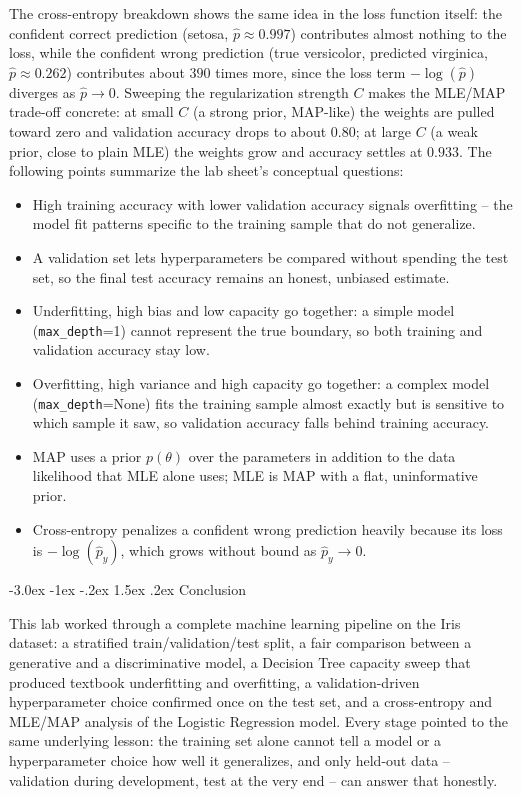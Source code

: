\documentclass[12pt,a4paper]{article}
\makeatletter
\renewcommand{\section}{\@startsection{section}{1}{\z@}%
  {-3.0ex \@plus -1ex \@minus -.2ex}%
  {1.5ex \@plus.2ex}%
  {\normalfont\Large\bfseries\color{primaryblue}}}
\makeatother
\begin{document}
The cross-entropy breakdown shows the same idea in the loss function itself: the confident correct prediction (setosa, $\hat p \approx 0.997$) contributes almost nothing to the loss, while the confident wrong prediction (true versicolor, predicted virginica, $\hat p \approx 0.262$) contributes about $390$ times more, since the loss term $-\log(\hat p)$ diverges as $\hat p \to 0$. Sweeping the regularization strength $C$ makes the MLE/MAP trade-off concrete: at small $C$ (a strong prior, MAP-like) the weights are pulled toward zero and validation accuracy drops to about $0.80$; at large $C$ (a weak prior, close to plain MLE) the weights grow and accuracy settles at $0.933$. The following points summarize the lab sheet's conceptual questions:
\begin{sloppypar}
\begin{itemize}
  \item High training accuracy with lower validation accuracy signals overfitting -- the model fit patterns specific to the training sample that do not generalize.
  \item A validation set lets hyperparameters be compared without spending the test set, so the final test accuracy remains an honest, unbiased estimate.
  \item Underfitting, high bias and low capacity go together: a simple model (\texttt{max\_depth}=1) cannot represent the true boundary, so both training and validation accuracy stay low.
  \item Overfitting, high variance and high capacity go together: a complex model (\texttt{max\_depth}=None) fits the training sample almost exactly but is sensitive to which sample it saw, so validation accuracy falls behind training accuracy.
  \item MAP uses a prior $p(\theta)$ over the parameters in addition to the data likelihood that MLE alone uses; MLE is MAP with a flat, uninformative prior.
  \item Cross-entropy penalizes a confident wrong prediction heavily because its loss is $-\log(\hat p_y)$, which grows without bound as $\hat p_y \to 0$.
\end{itemize}
\end{sloppypar}

\section{Conclusion}

This lab worked through a complete machine learning pipeline on the Iris dataset: a stratified train/validation/test split, a fair comparison between a generative and a discriminative model, a Decision Tree capacity sweep that produced textbook underfitting and overfitting, a validation-driven hyperparameter choice confirmed once on the test set, and a cross-entropy and MLE/MAP analysis of the Logistic Regression model. Every stage pointed to the same underlying lesson: the training set alone cannot tell a model or a hyperparameter choice how well it generalizes, and only held-out data -- validation during development, test at the very end -- can answer that honestly.
\end{document}
